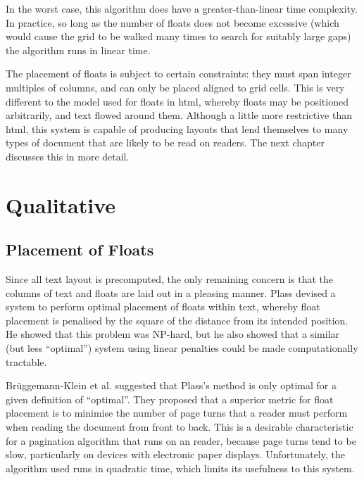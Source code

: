 In the worst case, this algorithm does have a greater-than-linear time complexity. In practice, so long as the number of floats does not become excessive (which would cause the grid to be walked many times to search for suitably large gaps) the algorithm runs in linear time.

The placement of floats is subject to certain constraints: they must span integer multiples of columns, and can only be placed aligned to grid cells. This is very different to the model used for floats in \gls{html}, whereby floats may be positioned arbitrarily, and text flowed around them. Although a little more restrictive than \gls{html}, this system is capable of producing layouts that lend themselves to many types of document that are likely to be read on \ebook{} readers. The next chapter discusses this in more detail.


\section{Qualitative}
\label{sec:aesthetics}

\subsection{Placement of Floats}
Since all text layout is precomputed, the only remaining concern is that the columns of text and floats are laid out in a pleasing manner. Plass\hspace{0pt}\cite{Plass1981} devised a system to perform optimal placement of floats within text, whereby float placement is penalised by the square of the distance from its intended position. He showed that this problem was NP-hard, but he also showed that a similar (but less ``optimal'') system using linear penalties could be made computationally tractable.

Br\"uggemann-Klein et al.\hspace{0pt}\cite{Bruggemann-Klein1995} suggested that Plass's method is only optimal for a given definition of ``optimal''. They proposed that a superior metric for float placement is to minimise the number of page turns that a reader must perform when reading the document from front to back. This is a desirable characteristic for a pagination algorithm that runs on an \ebook{} reader, because page turns tend to be slow, particularly on devices with electronic paper displays. Unfortunately, the algorithm used runs in quadratic time, which limits its usefulness to this system.

